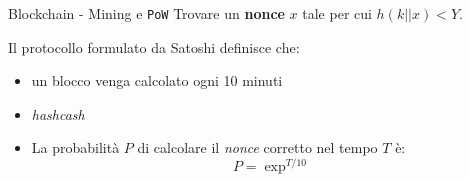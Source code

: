 \documentclass{beamer}
\begin{document}

\begin{frame}{Blockchain - Mining e \texttt{PoW}}
	Trovare un \textbf{nonce} $x$ tale per cui $h(k||x) < Y$.\newline
    
    Il protocollo formulato da Satoshi definisce che:
    \begin{itemize}
    	\item<1-> un blocco venga calcolato ogni 10 minuti
        \item<2-> \textit{hashcash}
        \item<3->La probabilità $P$ di calcolare il \textit{nonce} corretto nel tempo $T$ è:
			\begin{equation}
    			P = \exp^{T/10}
   			\end{equation}
    \end{itemize}
\end{frame}
\end{document}
